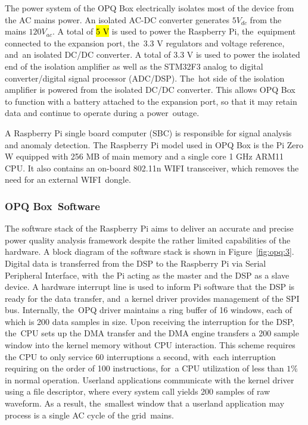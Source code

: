 \documentclass[energies,article,accept,moreauthors,pdftex]{Definitions/mdpi}
\begin{document}
The power system of the OPQ Box electrically isolates most of the device from the AC mains power.
An isolated AC-DC converter generates $5V_{dc}$ from the mains $120V_{ac}$.
A total of \hl{5 V} is used to power the Raspberry Pi, the~equipment connected to the expansion port, the~3.3 V regulators and voltage reference, and~an isolated DC/DC converter.
A total of 3.3 V is used to power the isolated end of the isolation amplifier as well as the STM32F3 analog to digital converter/digital signal processor (ADC/DSP).
The~hot side of the isolation amplifier is powered from the isolated DC/DC converter.
This allows OPQ Box to function with a battery attached to the expansion port, so that it may retain data and continue to operate during a power~outage.



A Raspberry Pi single board computer (SBC) is responsible for signal analysis and anomaly detection.
The Raspberry Pi model used in OPQ Box is the Pi Zero W equipped with 256 MB of main memory and a single core 1 GHz ARM11 CPU. It also contains an on-board 802.11n WIFI transceiver, which removes the need for an external WIFI~dongle.

\subsubsection{OPQ Box~Software}\label{subsec:software}

The software stack of the Raspberry Pi aims to deliver an accurate and precise power quality analysis framework despite the rather limited capabilities of the hardware.
A block diagram of the software stack is shown in Figure~\ref{fig:opq:3}.
Digital data is transferred from the DSP to the Raspberry Pi via Serial Peripheral Interface, with~the Pi acting as the master and the DSP as a slave device.
A hardware interrupt line is used to inform Pi software that the DSP is ready for the data transfer, and~a kernel driver provides management of the SPI bus.
Internally, the~OPQ driver maintains a ring buffer of 16 windows, each of which is 200 data samples in size.
Upon receiving the interruption for the DSP, the~CPU sets up the DMA transfer and the DMA engine transfers a 200 sample window into the kernel memory without CPU interaction.
This scheme requires the CPU to only service 60 interruptions a second, with~each interruption requiring on the order of 100 instructions, for~a CPU utilization of less than $1\%$ in normal operation.
Userland applications communicate with the kernel driver using a file descriptor, where every  %
 system call yields 200 samples of raw waveform.
As a result, the~smallest window that a userland application may process is a single AC cycle of the grid~mains.
\end{document}
